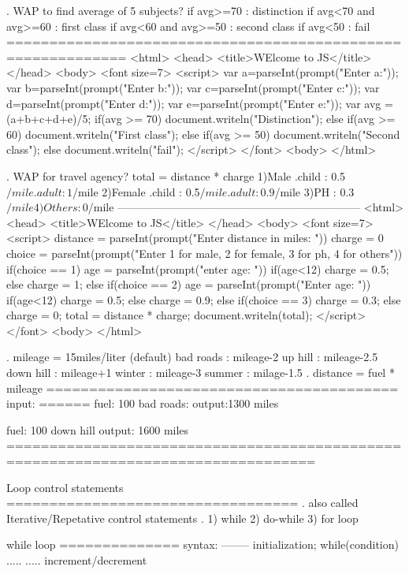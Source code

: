 . WAP to find average of 5 subjects?
  if avg>=70 : distinction
  if avg<70 and avg>=60 : first class
  if avg<60 and avg>=50 : second class
  if avg<50 : fail
============================================================
<html>
  <head>
   <title>WElcome to JS</title>
  </head>
  <body>
    <font size=7>
     <script>
		var a=parseInt(prompt("Enter a:"));
		var b=parseInt(prompt("Enter b:"));
		var c=parseInt(prompt("Enter c:"));
		var d=parseInt(prompt("Enter d:"));
		var e=parseInt(prompt("Enter e:"));
		var avg = (a+b+c+d+e)/5;
		if(avg >= 70)
		   document.writeln("Distinction");
		else if(avg >= 60)
		   document.writeln("First class");
		else if(avg >= 50)
		   document.writeln("Second class");
		else
		   document.writeln("fail");
	</script>
   </font>
  <body>
</html>

. WAP for travel agency?
  total = distance * charge
  1)Male
     .child : 0.5$/mile
     .adult : 1$/mile
  2)Female
     .child : 0.5$/mile
     .adult : 0.9$/mile
  3)PH : 0.3$/mile
  4)Others: 0$/mile
------------------------------------------------------------------
<html>
  <head>
   <title>WElcome to JS</title>
  </head>
  <body>
    <font size=7>
     <script>
		distance = parseInt(prompt("Enter distance in miles: "))
		charge = 0
		choice = parseInt(prompt("Enter 1 for male, 2 for female, 3 for ph, 4 for others"))
		if(choice == 1)
		{
			age = parseInt(prompt("enter age: "))
			if(age<12)
			   charge = 0.5;
			else
			   charge = 1;
		}
		else if(choice == 2)
		{
			age = parseInt(prompt("Enter age: "))
			if(age<12)
			   charge = 0.5;
			else
			   charge = 0.9;
		}
		else if(choice == 3)
		{
			  charge = 0.3;
		}
		else
		{
			charge = 0;
		}
		total = distance * charge;
		document.writeln(total);
	</script>
   </font>
  <body>
</html>

. mileage = 15miles/liter (default)
  bad roads : mileage-2
  up hill   : mileage-2.5
  down hill : mileage+1
  winter    : mileage-3
  summer    : milage-1.5
. distance = fuel * mileage
=========================================
input:
======
fuel: 100
bad roads: 
output:1300 miles

fuel: 100
down hill
output: 1600 miles
==================================================================================

Loop control statements
==================================
. also called Iterative/Repetative control statements
. 1) while
  2) do-while
  3) for loop

while loop
==============
syntax:
--------
initialization;
while(condition)
{
  .....
  .....
  increment/decrement
}

